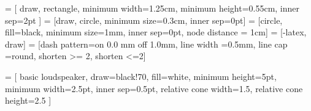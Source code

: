 

 = [
  draw, 
  rectangle, 
  minimum width=1.25cm, 
  minimum height=0.55cm, 
  inner sep=2pt
]
 = [draw, circle, minimum size=0.3cm, inner sep=0pt]
 = [circle, fill=black, minimum size=1mm, inner sep=0pt, node 
distance = 1cm]
 = [-latex, draw]
= [dash pattern=on 0.0 mm off 1.0mm, line width 
=0.5mm, line cap =round, shorten >= 2, shorten <=2]

 = [
  basic loudspeaker, 
  draw=black!70, 
  fill=white, 
  minimum height=5pt,
  minimum width=2.5pt,
  inner sep=0.5pt,
  relative cone width=1.5,
  relative cone height=2.5
]

